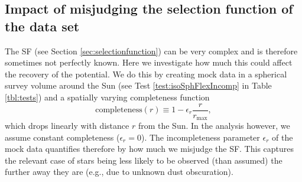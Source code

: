 \subsection{Impact of misjudging the selection function of the data set} \label{sec:results_incompR}

The SF (see Section \ref{sec:selectionfunction}) can be very complex and is therefore sometimes not perfectly known. Here we investigate how much this could affect the recovery of the potential. We do this by creating mock data in a spherical survey volume around the Sun (see Test \ref{test:isoSphFlexIncomp} in Table \ref{tbl:tests}) and a spatially varying completeness function
\begin{equation}
\text{completeness}(r) \equiv 1- \epsilon_r \frac{r}{r_\text{max}}, \label{eq:rad_incomp}
\end{equation}
which drops linearly with distance $r$ from the Sun. In the \RM{} analysis however, we assume constant completeness ($\epsilon_r=0$). The incompleteness parameter $\epsilon_r$ of the mock data quantifies therefore by how much we misjudge the SF. This captures the relevant case of stars being less likely to be observed (than assumed) the further away they are (e.g., due to unknown dust obscuration). 



